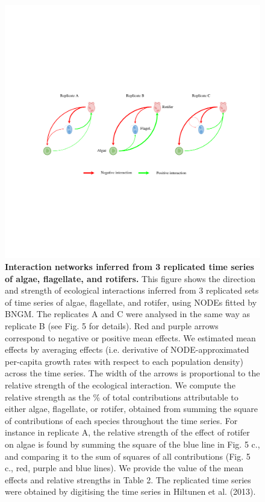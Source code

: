\documentclass[11pt, oneside]{article}
\begin{document}
\newpage
\begin{figure}[H]
\includegraphics[width=1\linewidth,page=6]{figure_6.png}
\caption{
    \textbf{Interaction networks inferred from 3 replicated time series of algae, flagellate, and rotifers.}
    This figure shows the direction and strength of ecological interactions inferred from 3 replicated sets of time series of algae, flagellate, and rotifer, using NODEs fitted by BNGM.
    The replicates A and C were analysed in the same way as replicate B (see Fig. 5 for details).
    Red and purple arrows correspond to negative or positive mean effects. 
    We estimated mean effects by averaging effects (i.e. derivative of NODE-approximated per-capita growth rates with respect to each population density) across the time series.
    The width of the arrows is proportional to the relative strength of the ecological interaction. 
    We compute the relative strength as the \% of total contributions attributable to either algae, flagellate, or rotifer, obtained from summing the square of contributions of each species throughout the time series.
    For instance in replicate A, the relative strength of the effect of rotifer on algae is found by summing the square of the blue line in Fig. 5 c., and comparing it to the sum of squares of all contributions (Fig. 5 c., red, purple and blue lines).
    We provide the value of the mean effects and relative strengths in Table 2.
    The replicated time series were obtained by digitising the time series in Hiltunen et al. (2013).
}
\end{figure}
\newpage
\end{document}
